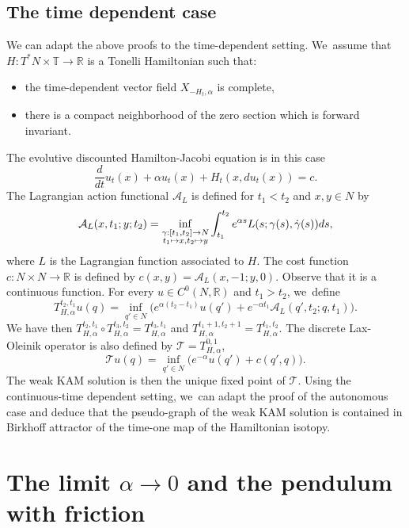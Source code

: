 \documentclass[JEP,XML,SOM,Unicode,NoFloatCountersInSection,published]{cedram}
\newcommand\mto{\mathchoice{\longmapsto}{\mapsto}{\mapsto}{\mapsto}}
\theoremstyle{definition}
\newcommand{\R}{\mathbb{R}}
\begin{document}
\subsection{The time dependent case}\label{sec:time-dependent}
We can adapt the above proofs to the time-dependent setting. We~assume that $H:T^*N\times {\mathbb T}\to \R$ is a Tonelli Hamiltonian such that:
\begin{itemize}
\item the time-dependent vector field $X_{-H_t, \alpha}$ is complete,
\item there is a compact neighborhood of the zero section which is forward invariant.
\end{itemize}
The evolutive discounted Hamilton-Jacobi equation is in this case
\begin{equation}
\label{eq:HJTD-discounted}
\frac d{dt}u_t(x)+\alpha u_t(x) + H_t(x,du_t(x))=c.
\end{equation}
The Lagrangian action functional $\mathcal A_L$ is defined for $t_1<t_2$ and $x, y\in N$ by
\[
\mathcal A_L(x, t_1; y; t_2)=\inf_{\substack{\gamma:[t_1, t_2]\to N\\t_1\mto x, t_2\mto y}} \int_{t_1}^{t_2}e^{\alpha s}L(s;\gamma(s), \dot \gamma (s))ds,
\]
where $L$ is the Lagrangian function associated to $H$.
The cost function $c:N\times N\to \R$ is defined by $c(x,y)=\mathcal A_L(x, -1; y, 0)$. Observe that it is a continuous function.
For every $u\in C^0(N, \R)$ and $t_1>t_2$, we~define
\[
T_{H, \alpha}^{t_2, t_1}u(q)=\inf_{q'\in N} \bigl(e^{\alpha (t_2-t_1)}u(q')+e^{-\alpha t_1}\mathcal A_L (q', t_2; q, t_1)\bigr).
\]
We have then $T_{H, \alpha}^{t_2, t_1}\circ T_{H, \alpha}^{t_3, t_2}=T_{H, \alpha}^{t_3, t_1}$ and $T_{H, \alpha}^{t_1+1, t_2+1}=T_{H, \alpha}^{t_1, t_2}$. The discrete Lax-Oleinik operator is also defined by $\mathcal T=T_{H, \alpha}^{0, 1}$, \ie
\[
\mathcal T u(q)= \inf_{q'\in N} \bigl(e^{-\alpha}u(q')+c(q', q)\bigr).
\]
The weak KAM solution is then the unique fixed point of $\mathcal T$. Using the continuous-time dependent setting, we~can adapt the proof of the autonomous case and deduce that
the pseudo-graph of the weak KAM solution is contained in
Birkhoff attractor of the time-one map of the Hamiltonian isotopy.

\section{The limit \texorpdfstring{$\alpha \to 0$}{a to 0} and the pendulum with friction}\label{sec:alpha-to-1}
\end{document}
